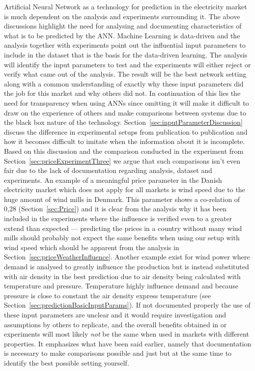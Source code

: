 Artificial Neural Network as a technology for prediction in the electricity market is much dependent on the analysis and experiments surrounding it. The above discussions highlight the need for analysing and documenting characteristics of what is to be predicted by the ANN. Machine Learning is data-driven\cite{18} and the analysis together with experiments point out the influential input parameters to include in the dataset that is the basis for the data-driven learning. The analysis will identify the input parameters to test and the experiments will either reject or verify what came out of the analysis. The result will be the best network setting along with a common understanding of exactly why these input parameters did the job for this market and why others did not. In continuation of this lies the need for transparency when using ANNs since omitting it will make it difficult to draw on the experience of others and make comparisons between systems due to the black box nature of the technology. Section~\ref{sec:inputParameterDiscussion} discuss the difference in experimental setups from publication to publication and how it becomes difficult to imitate when the information about it is incomplete. Based on this discussion and the comparison conducted in the experiment from Section~\ref{sec:priceExperimentThree} we argue that such comparisons isn't even fair due to the lack of documentation regarding analysis, dataset and experiments. An example of a meaningful price parameter in the Danish electricity market which does not apply for all markets is wind speed due to the huge amount of wind mills in Denmark. This parameter shows a co-relation of 0,28 (Section~\ref{sec:Price}) and it is clear from the analysis why it has been included in the experiments where the influence is verified even to a greater extend than expected --- predicting the prices in a country without many wind mills should probably not expect the same benefits when using our setup with wind speed which should be apparent from the analysis in Section~\ref{sec:priceWeatherInfluence}. Another example exist for wind power where demand is analysed to greatly influence the production but is instead substituted with air density in the best prediction due to air density being calculated with temperature and pressure. Temperature highly influence demand and because pressure is close to constant the air density express temperature (see Section~\ref{sec:predictionBasicInputParams}). If not documented properly the use of these input parameters are unclear and it would require investigation and assumptions by others to replicate, and the overall benefits obtained in or experiments will most likely \emph{not} be the same when used in markets with different properties. It emphasizes what have been said earlier, namely that documentation is necessary to make comparisons possible and just but at the same time to identify the best possible setting yourself. 

